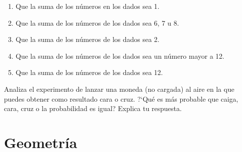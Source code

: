 \documentclass[11pt]{article}
\begin{document}
\begin{enumerate}[label=\alph*)] \itemsep-.3em
\item Que la suma de los n\'umeros en los dados sea 1.
\item Que la suma de los n\'umeros de los dados sea 6, 7 u 8.
\item Que la suma de los n\'umeros de los dados sea 2.
\item Que la suma de los n\'umeros de los dados sea un n\'umero mayor a 12.
\item Que la suma de los n\'umeros de los dados sea 12.
\end{enumerate}

Analiza el experimento de lanzar una moneda (no cargada) al aire en la que
puedes obtener como resultado cara o cruz. ?`Qu\'e es m\'as probable que caiga,
cara, cruz o la probabilidad es igual? Explica tu respuesta.

\vspace{3cm}

\section{Geometr\'ia}
\end{document}
